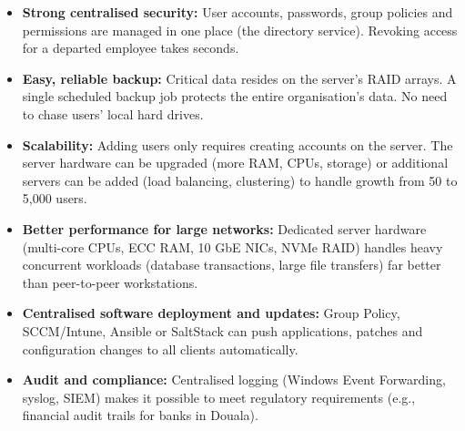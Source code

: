 \documentclass[11pt]{article}
\begin{document}
\begin{aretenir}
\begin{itemize}
\item \textbf{Strong centralised security:} User accounts, passwords, group policies and permissions are managed in one place (the directory service). Revoking access for a departed employee takes seconds.
\item \textbf{Easy, reliable backup:} Critical data resides on the server's RAID arrays. A single scheduled backup job protects the entire organisation's data. No need to chase users' local hard drives.
\item \textbf{Scalability:} Adding users only requires creating accounts on the server. The server hardware can be upgraded (more RAM, CPUs, storage) or additional servers can be added (load balancing, clustering) to handle growth from 50 to 5,000 users.
\item \textbf{Better performance for large networks:} Dedicated server hardware (multi-core CPUs, ECC RAM, 10 GbE NICs, NVMe RAID) handles heavy concurrent workloads (database transactions, large file transfers) far better than peer-to-peer workstations.
\item \textbf{Centralised software deployment and updates:} Group Policy, SCCM/Intune, Ansible or SaltStack can push applications, patches and configuration changes to all clients automatically.
\item \textbf{Audit and compliance:} Centralised logging (Windows Event Forwarding, syslog, SIEM) makes it possible to meet regulatory requirements (e.g., financial audit trails for banks in Douala).
\end{itemize}
\end{aretenir}
\end{document}
